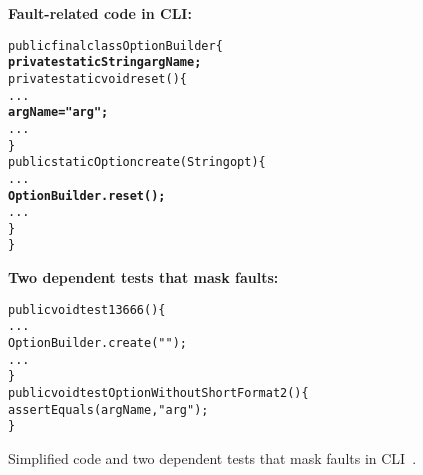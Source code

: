 
\begin{figure}[t]
\noindent \textbf{\small{Fault-related code in CLI:}}
\vspace{-2mm}
\begin{CodeOut}
\begin{alltt} 
public final class OptionBuilder \{
  \textbf{private static String argName;}
  private static void reset() \{
    ...
    \textbf{argName = "arg";}
    ...
  \}
  public static Option create(String opt) \{
    ...
    \textbf{OptionBuilder.reset();}
    ...
  \}
\}
\end{alltt}
\end{CodeOut}
\textbf{\small{Two dependent tests that mask faults:}}
\vspace{-2mm}
\begin{CodeOut}
\begin{alltt} 
  public void test13666() \{
    ...
    OptionBuilder.create("");
    ...
  \}
  public void testOptionWithoutShortFormat2() \{
    assertEquals(argName, "arg");
  \}
\end{alltt}
\end{CodeOut}
\vspace*{-13pt}
\caption{Simplified code and two dependent tests 
that mask faults in CLI~\cite{cli}. 
}
\label{fig:option_builder}
\end{figure}
